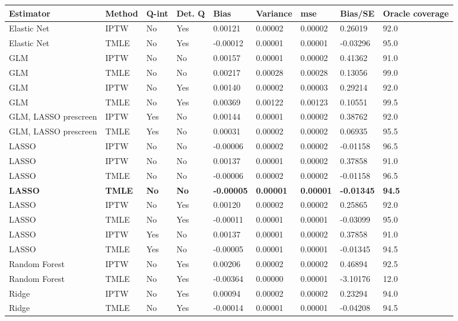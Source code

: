 
\begin{longtable}[l]{lllllllll}
\toprule
Estimator & Method & Q-int & Det. Q & Bias & Variance & mse & Bias/SE & Oracle coverage\\
\midrule
Elastic Net & IPTW & No & Yes & 0.00121 & 0.00002 & 0.00002 & 0.26019 & 92.0\\
Elastic Net & TMLE & No & Yes & -0.00012 & 0.00001 & 0.00001 & -0.03296 & 95.0\\
GLM & IPTW & No & No & 0.00157 & 0.00001 & 0.00002 & 0.41362 & 91.0\\
GLM & TMLE & No & No & 0.00217 & 0.00028 & 0.00028 & 0.13056 & 99.0\\
GLM & IPTW & No & Yes & 0.00140 & 0.00002 & 0.00003 & 0.29214 & 92.0\\
GLM & TMLE & No & Yes & 0.00369 & 0.00122 & 0.00123 & 0.10551 & 99.5\\
GLM, LASSO prescreen & IPTW & Yes & No & 0.00144 & 0.00001 & 0.00002 & 0.38762 & 92.0\\
GLM, LASSO prescreen & TMLE & Yes & No & 0.00031 & 0.00002 & 0.00002 & 0.06935 & 95.5\\
LASSO & IPTW & No & No & -0.00006 & 0.00002 & 0.00002 & -0.01158 & 96.5\\
LASSO & IPTW & No & No & 0.00137 & 0.00001 & 0.00002 & 0.37858 & 91.0\\
LASSO & TMLE & No & No & -0.00006 & 0.00002 & 0.00002 & -0.01158 & 96.5\\
\midrule
\textbf{LASSO} & \textbf{TMLE} & \textbf{No} & \textbf{No} & \textbf{-0.00005} & \textbf{0.00001} & \textbf{0.00001} & \textbf{-0.01345} & \textbf{94.5}\\
\midrule
LASSO & IPTW & No & Yes & 0.00120 & 0.00002 & 0.00002 & 0.25865 & 92.0\\
LASSO & TMLE & No & Yes & -0.00011 & 0.00001 & 0.00001 & -0.03099 & 95.0\\
LASSO & IPTW & Yes & No & 0.00137 & 0.00001 & 0.00002 & 0.37858 & 91.0\\
LASSO & TMLE & Yes & No & -0.00005 & 0.00001 & 0.00001 & -0.01345 & 94.5\\
Random Forest & IPTW & No & Yes & 0.00206 & 0.00002 & 0.00002 & 0.46894 & 92.5\\
Random Forest & TMLE & No & Yes & -0.00364 & 0.00000 & 0.00001 & -3.10176 & 12.0\\
Ridge & IPTW & No & Yes & 0.00094 & 0.00002 & 0.00002 & 0.23294 & 94.0\\
Ridge & TMLE & No & Yes & -0.00014 & 0.00001 & 0.00001 & -0.04208 & 94.5\\
\bottomrule
\end{longtable}

